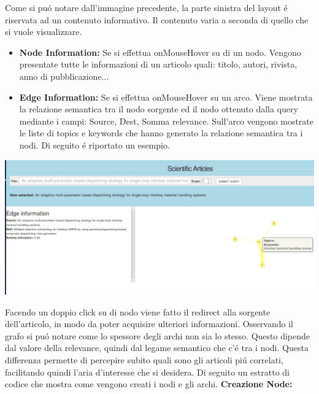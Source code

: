 \documentclass[11pt,a4paper]{article}
\begin{document}
Come si pu\'o notare dall'immagine precedente, la parte sinistra del layout \'e riservata ad un contenuto informativo. Il contenuto varia a seconda di quello che si vuole visualizzare.
\begin{itemize}
\item \textbf{Node Information:} Se si effettua onMouseHover su di un nodo. Vengono presentate tutte le informazioni di un articolo quali: titolo, autori, rivista, anno di pubblicazione... 
\item \textbf{Edge Information:} Se si effettua onMouseHover su un arco. Viene mostrata la relazione semantica tra il nodo sorgente ed il nodo ottenuto dalla query mediante i campi: Source, Dest, Somma relevance. Sull'arco vengono mostrate le liste di topics e keywords che hanno generato la relazione semantica tra i nodi. \newline
Di seguito \'e riportato un esempio.


\end{itemize} 
\begin{center}
\includegraphics[scale=0.40]{immaginiTesina/edgeInformation.png}
\newline \newline
\end{center}

Facendo un doppio click su di nodo viene fatto il redirect alla sorgente dell'articolo, in modo da poter acquisire ulteriori informazioni. \newline \newline
Osservando il grafo si pu\'o notare come lo spessore degli archi non sia lo stesso. Questo dipende dal valore della relevance, quindi dal legame semantico che c'\'e tra i nodi. Questa differenza permette di percepire subito quali sono gli articoli pi\'u correlati, facilitando quindi l'aria d'interesse che si desidera. \newline \newline
Di seguito un estratto di codice che mostra come vengono creati i nodi e gli archi.
\newline\newline
\textbf{Creazione Node:} 
\end{document}
